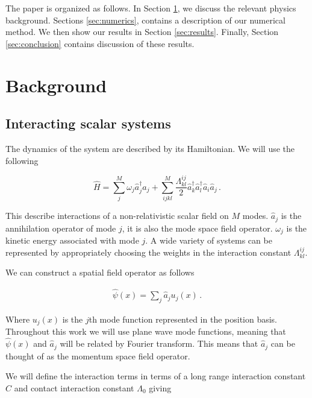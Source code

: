 \documentclass[aps,prd,twocolumn,superscriptaddress]{revtex4-1}
\begin{document}
The paper is organized as follows. In Section \ref{sec:Background}, we discuss the relevant physics background. Sections \ref{sec:numerics}, contains a description of our numerical method. We then show our results in Section \ref{sec:results}. Finally, Section \ref{sec:conclusion} contains discussion of these results.


\section{Background} \label{sec:Background}

\subsection{Interacting scalar systems}

The dynamics of the system are described by its Hamiltonian. We will use the following

\begin{equation} \label{Ham}
    \hat H = \sum_j^M \omega_j \hat a_j^\dagger \hat a_j + \sum_{ijkl}^M \frac{\Lambda_{kl}^{ij}}{2} \hat a_k^\dagger \hat a_l^\dagger \hat a_i \hat a_j \, .
\end{equation}

This describe interactions of a non-relativistic scalar field on $M$ modes. $\hat a_j$ is the annihilation operator of mode $j$, it is also the mode space field operator. $\omega_j$ is the kinetic energy associated with mode $j$. A wide variety of systems can be represented by appropriately choosing the weights in the interaction constant $\Lambda_{kl}^{ij}$. 

We can construct a spatial field operator as follows

\begin{align} \label{psi2a}
    \hat \psi (x) = \sum_j \hat a_j u_j(x) \, .
\end{align}

Where $u_j(x)$ is the $j$th mode function represented in the position basis. Throughout this work we will use plane wave mode functions, meaning that $\hat \psi(x)$ and $\hat a_j$ will be related by Fourier transform. This means that $\hat a_j$ can be thought of as the momentum space field operator. 

We will define the interaction terms in terms of a long range interaction constant $C$ and contact interaction constant $\Lambda_0$ giving
\end{document}
